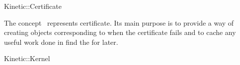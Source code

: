 

\begin{ccRefConcept}{Kinetic::Certificate}


\ccDefinition
  
The concept \ccClassName\ represents certificate. Its main purpose is
to provide a way of creating  objects corresponding to when
the certificate fails and to cache any useful work done in find the
 for later.

\ccOperations





\ccSeeAlso

Kinetic::Kernel

\end{ccRefConcept}


